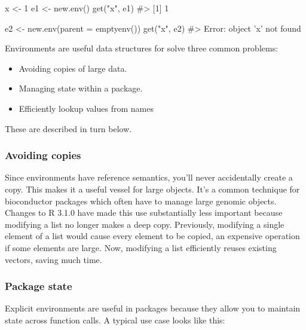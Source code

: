 \documentclass[oneside]{book}
\newenvironment{Shaded}{}{}
\newcommand{\KeywordTok} [1]{\textcolor[rgb]{0.00,0.44,0.13}{{#1}}}
\newcommand{\DataTypeTok}[1]{\textcolor[rgb]{0.56,0.13,0.00}{{#1}}}
\newcommand{\DecValTok}  [1]{\textcolor[rgb]{0.25,0.63,0.44}{{#1}}}
\newcommand{\StringTok}  [1]{\textcolor[rgb]{0.25,0.44,0.63}{{#1}}}
\newcommand{\CommentTok} [1]{\textcolor[rgb]{0.38,0.63,0.69}{{#1}}}
\newcommand{\NormalTok}  [1]{{#1}}
\begin{document}
\begin{Shaded}
\begin{Highlighting}[]
\NormalTok{x <-}\StringTok{ }\DecValTok{1}
\NormalTok{e1 <-}\StringTok{ }\KeywordTok{new.env}\NormalTok{()}
\KeywordTok{get}\NormalTok{(}\StringTok{"x"}\NormalTok{, e1)}
\CommentTok{#> [1] 1}

\NormalTok{e2 <-}\StringTok{ }\KeywordTok{new.env}\NormalTok{(}\DataTypeTok{parent =} \KeywordTok{emptyenv}\NormalTok{())}
\KeywordTok{get}\NormalTok{(}\StringTok{"x"}\NormalTok{, e2)}
\CommentTok{#> Error: object 'x' not found}
\end{Highlighting}
\end{Shaded}

Environments are useful data structures for solve three common problems:

\begin{itemize}
\itemsep1pt\parskip0pt
\item
  Avoiding copies of large data.
\item
  Managing state within a package.
\item
  Efficiently lookup values from names
\end{itemize}

These are described in turn below.

\subsubsection{Avoiding copies}\label{avoiding-copies}

Since environments have reference semantics, you'll never accidentally
create a copy. This makes it a useful vessel for large objects. It's a
common technique for bioconductor packages which often have to manage
large genomic objects. Changes to R 3.1.0 have made this use
substantially less important because modifying a list no longer makes a
deep copy. Previously, modifying a single element of a list would cause
every element to be copied, an expensive operation if some elements are
large. Now, modifying a list efficiently reuses existing vectors, saving
much time.

\subsubsection{Package state}\label{package-state}

Explicit environments are useful in packages because they allow you to
maintain state across function calls. A typical use case looks like
this:
\end{document}

